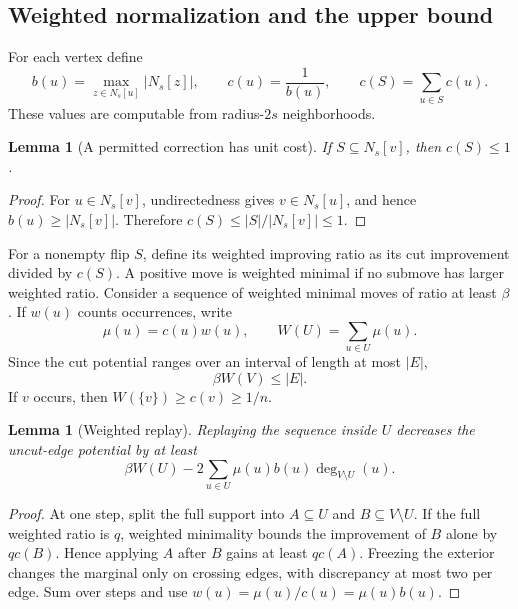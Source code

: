 \documentclass[11pt]{article}
\newtheorem{lemma}[theorem]{Lemma}
\theoremstyle{definition}
\theoremstyle{remark}
\newcommand{\N}{N}
\begin{document}
\subsection{Weighted normalization and the upper bound}

For each vertex define
\begin{equation}\label{eq:cost}
 b(u)=\max_{z\in\N_s[u]}|\N_s[z]|,
 \qquad c(u)=\frac1{b(u)},
 \qquad c(S)=\sum_{u\in S}c(u).
\end{equation}
These values are computable from radius-$2s$ neighborhoods.

\begin{lemma}[A permitted correction has unit cost]\label{lem:unit-cost}
If $S\subseteq\N_s[v]$, then $c(S)\leq1$.
\end{lemma}

\begin{proof}
For $u\in\N_s[v]$, undirectedness gives $v\in\N_s[u]$, and hence
$b(u)\geq|\N_s[v]|$.  Therefore
$c(S)\leq |S|/|\N_s[v]|\leq1$.
\end{proof}

For a nonempty flip $S$, define its weighted improving ratio as its cut improvement
divided by $c(S)$.  A positive move is weighted minimal if no submove has larger
weighted ratio.  Consider a sequence of weighted minimal moves of ratio at least
$\beta$.  If $w(u)$ counts occurrences, write
\[
 \mu(u)=c(u)w(u),
 \qquad W(U)=\sum_{u\in U}\mu(u).
\]
Since the cut potential ranges over an interval of length at most $|E|$,
\begin{equation}\label{eq:weighted-total}
 \beta W(V)\leq |E|.
\end{equation}
If $v$ occurs, then $W(\{v\})\geq c(v)\geq1/n$.

\begin{lemma}[Weighted replay]\label{lem:weighted-replay}
Replaying the sequence inside $U$ decreases the uncut-edge potential by at least
\[
 \beta W(U)-2\sum_{u\in U}\mu(u)b(u)\deg_{V\setminus U}(u).
\]
\end{lemma}

\begin{proof}
At one step, split the full support into $A\subseteq U$ and $B\subseteq V\setminus
U$.  If the full weighted ratio is $q$, weighted minimality bounds the improvement
of $B$ alone by $qc(B)$.  Hence applying $A$ after $B$ gains at least $qc(A)$.
Freezing the exterior changes the marginal only on crossing edges, with discrepancy
at most two per edge.  Sum over steps and use
$w(u)=\mu(u)/c(u)=\mu(u)b(u)$.
\end{proof}
\end{document}
